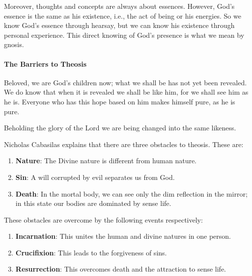 Moreover, thoughts and concepts are always about essences. However, God's essence is the same as his existence, i.e., the act of being or his energies. So we know God's essence through hearsay, but we can know his existence through personal experience. This direct knowing of God's presence is what we mean by gnosis.

\paragraph{The Barriers to Theosis}


\begin{quotex}
Beloved, we are God's children now; what we shall be has not yet been revealed. We do know that when it is revealed we shall be like him, for we shall see him as he is. Everyone who has this hope based on him makes himself pure, as he is pure.

Beholding the glory of the Lord we are being changed into the same likeness.
\end{quotex}


Nicholas Cabasilas explains that there are three obstacles to theosis. These are:

\begin{enumerate}


\item \textbf{Nature}: The Divine nature is different from human nature.


\item \textbf{Sin}: A will corrupted by evil separates us from God.


\item \textbf{Death}: In the mortal body, we can see only the dim reflection in the mirror; in this state our bodies are dominated by sense life.
\end{enumerate}


These obstacles are overcome by the following events respectively:

\begin{enumerate}


\item \textbf{Incarnation}: This unites the human and divine natures in one person.

\item \textbf{Crucifixion}: This leads to the forgiveness of sins.

\item \textbf{Resurrection}: This overcomes death and the attraction to sense life.
\end{enumerate}


